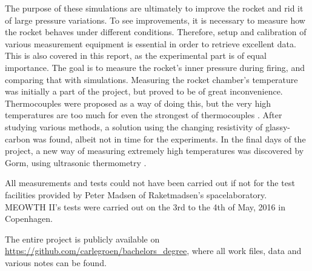 The purpose of these simulations are ultimately to improve the rocket and rid it of large pressure variations. To see improvements, it is necessary to measure how the rocket behaves under different conditions. Therefore, setup and calibration of various measurement equipment is essential in order to retrieve excellent data. This is also covered in this report, as the experimental part is of equal importance. The goal is to measure the rocket's inner pressure during firing, and comparing that with simulations. Measuring the rocket chamber's temperature was initially a part of the project, but proved to be of great inconvenience. Thermocouples were proposed as a way of doing this, but the very high temperatures are too much for even the strongest of thermocouples \cite{thermocoup}. After studying various methods, a solution using the changing resistivity of glassy-carbon was found, albeit not in time for the experiments. In the final days of the project, a new way of measuring extremely high temperatures was discovered by Gorm, using ultrasonic thermometry \cite{ultrasonic}.
 

All measurements and tests could not have been carried out if not for the test facilities provided by Peter Madsen of Raketmadsen's spacelaboratory. MEOWTH II's tests were carried out on the 3rd to the 4th of May, 2016 in Copenhagen.

The entire project is publicly available on \url{https://github.com/carlegroen/bachelors_degree}, where all work files, data and various notes can be found.
